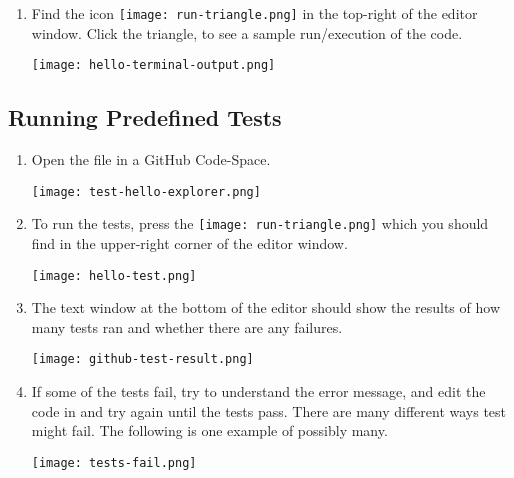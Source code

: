 \begin{enumerate}
\begin{listing}{Calls to Function }{calls}
\begin{minipage}[c]{0.95\textwidth}
\begin{lstlisting}
    # Follow the two examples above. Add a line
    #   so that Python will print a hello message 
    #   to pierre.
    # CHALLENGE: student must complete the implementation.
    raise NotImplementedError()
\end{lstlisting}\end{minipage}\end{listing}




\item Find the icon \texttt{[image: run-triangle.png]} in the
top-right of the editor window.  Click the triangle, to see a sample
run/execution of the code.

\noindent\texttt{[image: hello-terminal-output.png]}

\end{enumerate}

\subsection{Running Predefined Tests}
\label{sec.run.tests}
\begin{enumerate}


\item Open the file  in a GitHub Code-Space.

\noindent\texttt{[image: test-hello-explorer.png]}

\item To run the tests, press the
\texttt{[image: run-triangle.png]} which you should find in
the upper-right corner of the editor window.

\noindent\texttt{[image: hello-test.png]}


\item The text window at the bottom of the editor should show the results of
how many tests ran and whether there are any failures.

\noindent\texttt{[image: github-test-result.png]}

\item If some of the tests fail, try to understand the error message, and edit
  the code in  and try again until the tests pass.  There are many
  different ways test might fail.  The following is one example of possibly many.

\noindent\texttt{[image: tests-fail.png]}


\end{enumerate}

\clearpage

